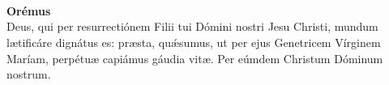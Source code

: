 \\[1mm]
\\[1mm]
\\[2mm]
\textbf{Orémus}\\
Deus, qui per resurrectiónem Filii tui Dómini nostri Jesu Christi,
mundum l{\ae}tificáre dignátus es: pr{\ae}sta, qu{\'\ae}sumus, ut per ejus Genetricem Vírginem Maríam,
perpétu{\ae} capiámus gáudia vit{\ae}. Per eúmdem Christum Dóminum nostrum.\\[2mm]
